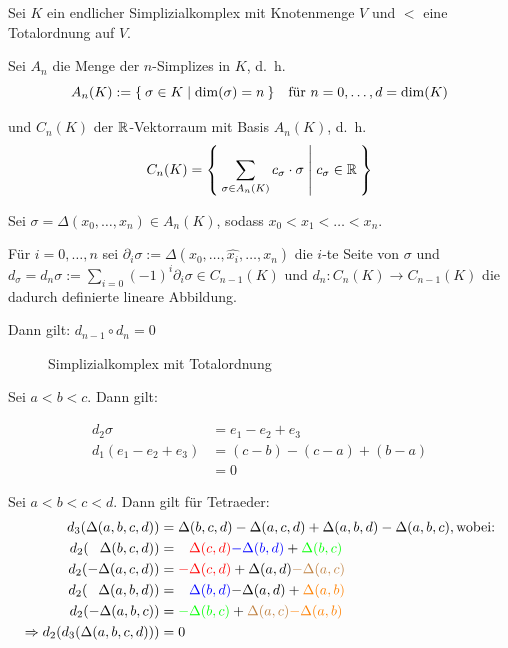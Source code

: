 \begin{bemerkung}\label{kor:9.11}
    Sei $K$ ein endlicher Simplizialkomplex mit Knotenmenge $V$
    und $<$ eine Totalordnung auf $V$.

    Sei $A_n$ die Menge der $n$-Simplizes in $K$, d.~h.
    \[A_n(K) := \Set{ \sigma \in K | \dim(\sigma) = n}\;\;\; \text{für } n=0, \dots, d=\dim(K)\]

    und $C_n(K)$ der $\mathbb{R}$-Vektorraum mit Basis $A_n(K)$, d.~h.
    \[C_n(K) = \Set{\sum_{\sigma \in A_n(K)} c_\sigma \cdot \sigma | c_\sigma \in \ensuremath{\mathbb{R}}}\]

    Sei $\sigma = \Delta(x_0, \dots, x_n) \in A_n(K)$, sodass 
    $x_0 < x_1 < \dots < x_n$.

    Für $i = 0, \dots, n$ sei $\partial_i \sigma := \Delta(x_0, \dots, \hat{x_i}, \dots, x_n)$
    die $i$-te Seite von $\sigma$ und $d_\sigma = d_n \sigma := \sum_{i=0} (-1)^i \partial_i \sigma \in C_{n-1} (K)$
    und $d_n: C_n(K) \rightarrow C_{n-1}(K)$ die dadurch definierte lineare
    Abbildung.

    Dann gilt: $d_{n-1} \circ d_n = 0$
\end{bemerkung}

\begin{beispiel}
    \begin{figure}[h!]
        \centering
        
        \caption{Simplizialkomplex mit Totalordnung}
    \end{figure}

    Sei $a < b < c$. Dann gilt:

    \begin{align*}
      d_2 \sigma          &= e_1 - e_2 + e_3\\
      d_1(e_1- e_2 + e_3) &= (c - b) - (c-a) + (b - a)\\
                          &= 0
    \end{align*}

    Sei $a<b<c<d$. Dann gilt für Tetraeder:\\
    \begin{align*}
      d_3(\Delta(a,b,c,d)) &= \Delta(b,c,d)-\Delta(a,c,d)+\Delta(a,b,d)-\Delta(a,b,c), \text{wobei:}\\
      d_2(\hphantom{-}\Delta(b,c,d)) &= \hphantom{-}\textcolor{red}{\Delta(c,d)}\textcolor{blue}{-\Delta(b,d)}+\textcolor{green}{\Delta(b,c)}\\
      d_2(-\Delta(a,c,d))  &= \textcolor{red}{-\Delta(c,d)}+\textcolor{black}{\Delta(a,d)}\textcolor{brown}{-\Delta(a,c)}\\
      d_2(\hphantom{-}\Delta(a,b,d)) &= \hphantom{-}\textcolor{blue}{\Delta(b,d)}\textcolor{black}{-\Delta(a,d)}+\textcolor{orange}{\Delta(a,b)}\\
      d_2(-\Delta(a,b,c))  &= \textcolor{green}{-\Delta(b,c)}+\textcolor{brown}{\Delta(a,c)}\textcolor{orange}{-\Delta(a,b)}\\
      \Rightarrow d_2(d_3(\Delta(a,b,c,d))) &=0
    \end{align*}
\end{beispiel}

